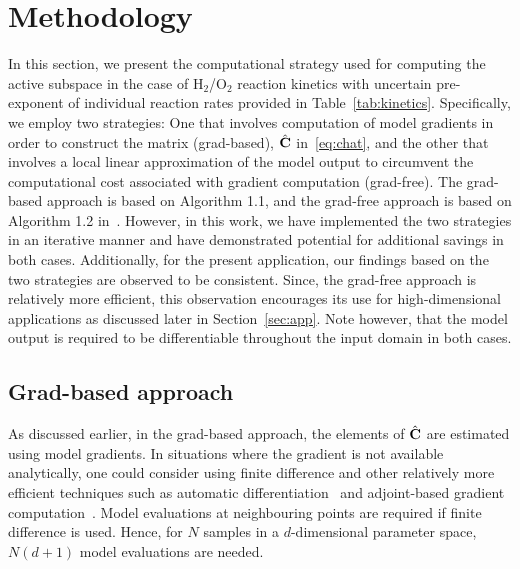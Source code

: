 \section{Methodology}
\label{sec:method}

In this section, we present the computational strategy used for computing the active subspace in the case of
H$_2$/O$_2$ reaction kinetics with uncertain pre-exponent of individual reaction rates provided in
Table~\ref{tab:kinetics}. Specifically, we employ two strategies: One that involves computation of model
gradients in order to construct the matrix (grad-based), $\hat{\mathbf{{C}}}$ in~\eqref{eq:chat}, and the other that involves a local 
linear approximation of the model output to circumvent the computational cost associated with gradient
computation (grad-free). The grad-based approach is based on Algorithm 1.1, and the grad-free approach is
based on Algorithm 1.2 in~\cite{Constantine:2015}. However, in this work, we have implemented the
two strategies in an iterative manner and have demonstrated potential for additional savings in both cases.
Additionally, for the present application, our findings based on the two strategies are observed to be consistent.
Since, the grad-free approach is relatively more efficient, this observation encourages its use for high-dimensional
applications as discussed later in Section~\ref{sec:app}. Note however, that the model output is required to be
differentiable throughout the input domain in both cases.

\subsection{Grad-based approach}
\label{sub:grad}

As discussed earlier, in the grad-based approach, the elements of $\hat{\mathbf{{C}}}$ are estimated using model gradients.
 In situations where the gradient is not available analytically, one could consider using
finite difference and other relatively more efficient techniques such as automatic differentiation~\cite{Kiparissides:2009} 
and adjoint-based gradient computation~\cite{Jameson:1988,Gunzburger:2003,Borzi:2011,Alexanderian:2017}.
Model evaluations at neighbouring points are required if finite difference is used. Hence, for 
$N$ samples in a $d$-dimensional parameter space, $N(d+1)$ model evaluations are needed. 


